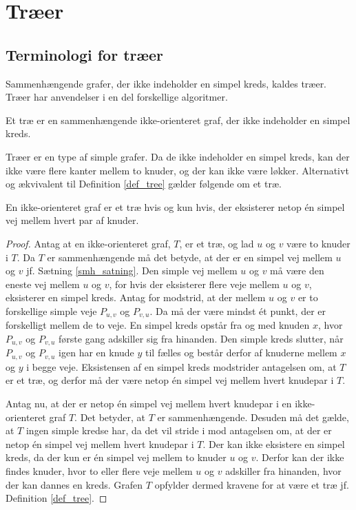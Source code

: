 \chapter{Træer}
\section{Terminologi for træer}

Sammenhængende grafer, der ikke indeholder en simpel kreds, kaldes træer. Træer har anvendelser i en del forskellige algoritmer.

\begin{defn}
Et træ er en sammenhængende ikke-orienteret graf, der ikke indeholder en simpel kreds.
\label{def_tree}
\end{defn}

Træer er en type af simple grafer. Da de ikke indeholder en simpel kreds, kan der ikke være flere kanter mellem to knuder, og der kan ikke være løkker. Alternativt og ækvivalent til Definition \ref{def_tree} gælder følgende om et træ.

\begin{thm}\label{thm:vej_tree}
En ikke-orienteret graf er et træ hvis og kun hvis, der eksisterer netop én simpel vej mellem hvert par af knuder. 
\end{thm}

\begin{proof}
	Antag at en ikke-orienteret graf, $T$, er et træ, og lad $u$ og $v$ være to knuder i $T$. 
	Da $T$ er sammenhængende må det betyde, at der er en simpel vej mellem $u$ og $v$ jf. Sætning \ref{smh_satning}. 
	Den simple vej mellem $u$ og $v$ må være den eneste vej mellem $u$ og $v$, for hvis der eksisterer flere veje mellem $u$ og $v$, eksisterer en simpel kreds. 
	Antag for modstrid, at der mellem $u$ og $v$ er to forskellige simple veje $P_{u,v}$ og $P_{v,u}$. Da må der være mindst ét punkt, der er forskelligt mellem de to veje. 
	En simpel kreds opstår fra og med knuden $x$, hvor $P_{u,v}$ og $P_{v,u}$ første gang adskiller sig fra hinanden. 
	Den simple kreds slutter, når $P_{u,v}$ og $P_{v,u}$ igen har en knude $y$ til fælles og består derfor af knuderne mellem $x$ og $y$ i begge veje.
	Eksistensen af en simpel kreds modstrider antagelsen om, at $T$ er et træ, og derfor må der være netop én simpel vej mellem hvert knudepar i $T$.

Antag nu, at der er netop én simpel vej mellem hvert knudepar i en ikke-orienteret graf $T$.
	Det betyder, at $T$ er sammenhængende. Desuden må det gælde, at $T$ ingen simple kredse har, da det vil stride i mod antagelsen om, at der er netop én simpel vej mellem hvert knudepar i $T$.
	Der kan ikke eksistere en simpel kreds, da der kun er én simpel vej mellem to knuder $u$ og $v$. Derfor kan der ikke findes knuder, hvor to eller flere veje mellem $u$ og $v$ adskiller fra hinanden, hvor der kan dannes en kreds.
	Grafen $T$ opfylder dermed kravene for at være et træ jf. Definition \ref{def_tree}.
\end{proof}

